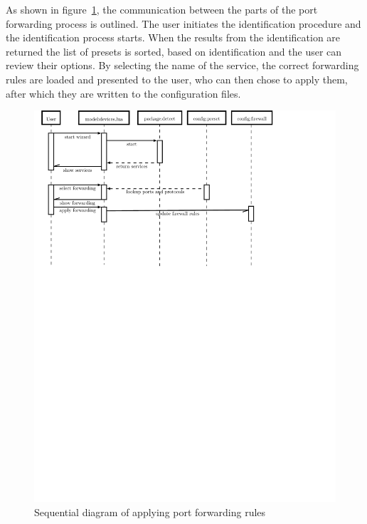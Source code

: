 \documentclass[g5paper,11pt]{kth-bcs}
\begin{document}
As shown in figure~\ref{fig:wizard-seq_dia}, the communication between the parts of the port forwarding process is outlined.
The user initiates the identification procedure and the identification process starts.
When the results from the identification are returned the list of presets is sorted, based on identification and the user can review their options.
By selecting the name of the service, the correct forwarding rules are loaded and presented to the user, who can then chose to apply them, after which they are written to the configuration files.
\begin{figure}[h!]
   \centering
   \includegraphics[width=15cm]{wizard-seq_dia}
   \caption{Sequential diagram of applying port forwarding rules}
   \label{fig:wizard-seq_dia}
\end{figure}
\end{document}
